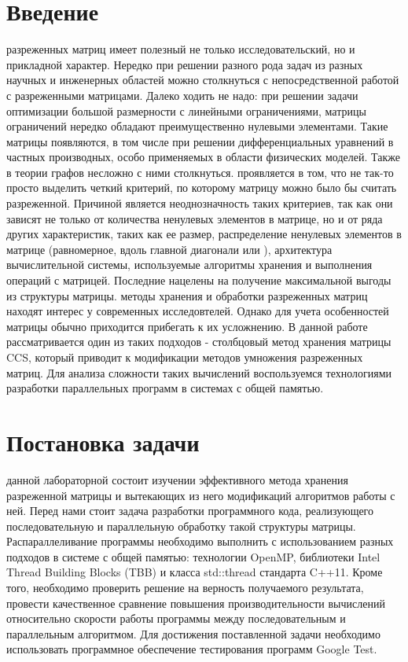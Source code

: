 \documentclass[12pt]{report}
\begin{document}
\setcounter{page}{2}

\tableofcontents

\newpage

\section*{Введение}
 разреженных матриц имеет полезный не только исследовательский, но и прикладной характер. Нередко при решении разного рода задач из разных научных и инженерных областей можно столкнуться с непосредственной работой с разреженными матрицами. Далеко ходить не надо: при решении задачи оптимизации большой размерности с линейными ограничениями, матрицы ограничений нередко обладают преимущественно нулевыми элементами. Такие матрицы появляются, в том числе при решении дифференциальных уравнений в частных производных, особо применяемых в области физических моделей. Также в теории графов несложно с ними столкнуться.
 проявляется в том, что не так-то просто выделить четкий критерий, по которому матрицу можно было бы считать разреженной. Причиной является неоднозначность таких критериев, так как они зависят не только от количества ненулевых элементов в матрице, но и от ряда других характеристик, таких как ее размер, распределение ненулевых элементов в матрице (равномерное, вдоль главной диагонали или ), архитектура вычислительной системы, используемые алгоритмы хранения и выполнения операций с матрицей. Последние нацелены на получение максимальной выгоды из структуры матрицы.
 методы хранения и обработки разреженных матриц находят интерес у современных исследовтелей. Однако для учета особенностей матрицы обычно приходится прибегать к их усложнению. В данной работе рассматривается один из таких подходов - столбцовый метод хранения матрицы CCS, который приводит к модификации методов умножения разреженных матриц. Для анализа сложности таких вычислений воспользуемся технологиями разработки параллельных программ в системах с общей памятью.

\newpage

\section*{Постановка задачи}
 данной лабораторной состоит изучении эффективного метода хранения разреженной матрицы и вытекающих из него модификаций алгоритмов работы с ней. Перед нами стоит задача разработки программного кода, реализующего последовательную и параллельную обработку такой структуры матрицы. Распараллеливание программы необходимо выполнить с использованием разных подходов в системе с общей памятью: технологии OpenMP, библиотеки Intel Thread Building Blocks (TBB) и класса std::thread стандарта C++11. Кроме того, необходимо проверить решение на верность получаемого результата, провести качественное сравнение повышения производительности вычислений относительно скорости работы программы между последовательным и параллельным алгоритмом. Для достижения поставленной задачи необходимо использовать программное обеспечение тестирования программ Google Test.
\end{document}
